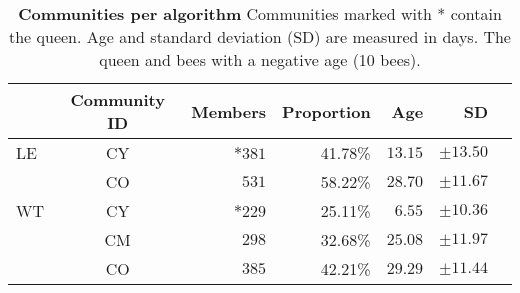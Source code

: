 \begin{table}
\centering
\caption[Communities per algorithm]{\textbf{Communities per algorithm} Communities marked with * contain the queen. Age and standard deviation (SD) are measured in days. The queen and bees with a negative age (10 bees).}
\label{tab:n3-communities}
\vspace*{5mm}
\begin{tabular}{lcrrrrr}
	\toprule
	{}  & Community ID & Members & Proportion & Age & SD\\
	\midrule  
	\quad LE  & CY & $*381$  & 41.78\% & $13.15$ & $\pm13.50$ \\
	          & CO & $531$   & 58.22\% & $28.70$ & $\pm11.67$ \\
    \midrule 
	\quad WT & CY & $*229$  & 25.11\% & $6.55$  & $\pm10.36$\\
			 & CM & $298$  & 32.68\% & $25.08$ & $\pm11.97$\\
			 & CO & $385$  & 42.21\% & $29.29$ & $\pm11.44$\\
	\bottomrule
\end{tabular}
\end{table}